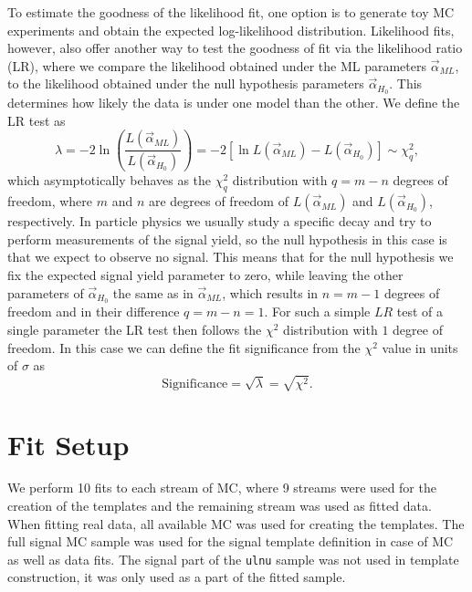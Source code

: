To estimate the goodness of the likelihood fit, one option is to generate toy MC experiments and obtain the expected log-likelihood distribution. Likelihood fits, however, also offer another way to test the goodness of fit via the likelihood ratio (LR), where we compare the likelihood obtained under the ML parameters $\vec\alpha_{ML}$, to the likelihood obtained under the null hypothesis parameters $\vec\alpha_{H_0}$. This determines how likely the data is under one model than the other. We define the LR test as
\begin{equation}
\label{eq:lr}
\lambda = -2\ln\left(\frac{L(\vec \alpha_{ML})}{L(\vec \alpha_{H_0})}\right) = -2 \left[ \ln L(\vec \alpha_{ML}) - L(\vec \alpha_{H_0})\right] \sim \chi^2_q,
\end{equation}
which asymptotically behaves as the $\chi^2_q$ distribution with $q=m-n$ degrees of freedom, where $m$ and $n$ are degrees of freedom of $L(\vec \alpha_{ML})$ and $L(\vec \alpha_{H_0})$, respectively. In particle physics we usually study a specific decay and try to perform measurements of the signal yield, so the null hypothesis in this case is that we expect to observe no signal. This means that for the null hypothesis we fix the expected signal yield parameter to zero, while leaving the other parameters of $\vec\alpha_{H_0}$ the same as in $\vec\alpha_{ML}$, which results in $n = m-1$ degrees of freedom and in their difference $q = m -n = 1$. For such a simple $LR$ test of a single parameter the LR test then follows the $\chi^2$ distribution with $1$ degree of freedom. In this case we can define the fit significance from the $\chi^2$ value in units of $\sigma$ as
\begin{equation}
\label{eq:ss}
\mathrm{Significance} = \sqrt{\lambda} = \sqrt{\chi^2}.
\end{equation}

\section{Fit Setup}
We perform 10 fits to each stream of MC, where 9 streams were used for the creation of the templates and the remaining stream was used as fitted data. When fitting real data, all available MC was used for creating the templates. The full signal MC sample was used for the signal template definition in case of MC as well as data fits. The signal part of the \texttt{ulnu} sample was not used in template construction, it was only used as a part of the fitted sample. 

